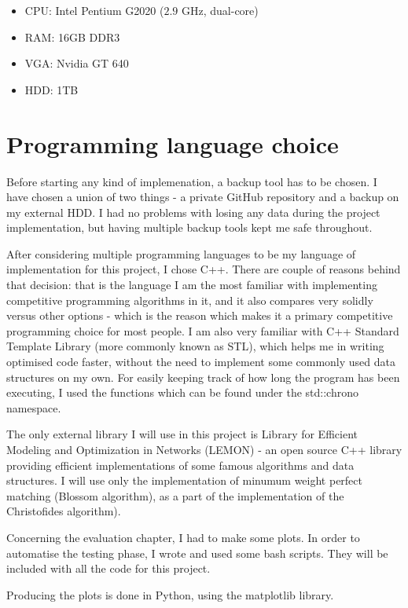 \documentclass[12pt,twoside,notitlepage]{report}
\begin{document}
\begin{itemize}
\item CPU: Intel Pentium G2020 ($2.9$ GHz, dual-core)
\item RAM: 16GB DDR3
\item VGA: Nvidia GT 640
\item HDD: 1TB
\end{itemize}

\section{Programming language choice}

Before starting any kind of implemenation, a backup tool has to be chosen. I have chosen a union of two things - a private GitHub repository and a backup on my external HDD. I had no problems with losing any data during the project implementation, but having multiple backup tools kept me safe throughout.

After considering multiple programming languages to be my language of implementation for this project, I chose C++. There are couple of reasons behind that decision: that is the language I am the most familiar with implementing competitive programming algorithms in it, and it also compares very solidly versus other options - which is the reason which makes it a primary competitive programming choice for most people. I am also very familiar with C++ Standard Template Library (more commonly known as STL), which helps me in writing optimised code faster, without the need to implement some commonly used data structures on my own. For easily keeping track of how long the program has been executing, I used the functions which can be found under the std::chrono namespace.

The only external library I will use in this project is Library for Efficient Modeling and Optimization in Networks (LEMON)\cite{Dezs__2011} - an open source C++ library providing efficient implementations of some famous algorithms and data structures. I will use only the implementation of minumum weight perfect matching (Blossom algorithm), as a part of the implementation of the Christofides algorithm).

Concerning the evaluation chapter, I had to make some plots. In order to automatise the testing phase, I wrote and used some bash scripts. They will be included with all the code for this project.

Producing the plots is done in Python, using the matplotlib library.
\end{document}
